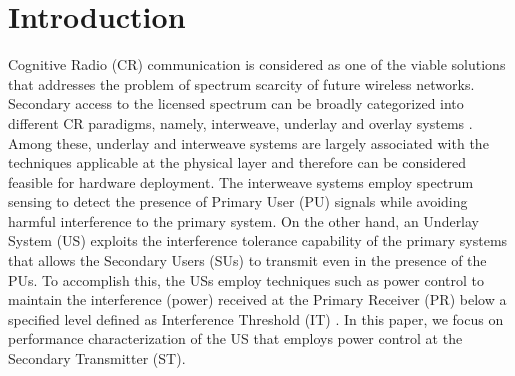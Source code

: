 \section{Introduction}%
Cognitive Radio (CR) communication is considered as one of the viable solutions that addresses the problem of spectrum scarcity of future wireless networks. Secondary access to the licensed spectrum can be broadly categorized into different CR paradigms, namely, interweave, underlay and overlay systems \cite{Goldsmith09}. Among these, underlay and interweave systems are largely associated with the techniques applicable at the physical layer and therefore can be considered feasible for hardware deployment. %
The interweave systems employ spectrum sensing to detect the presence of Primary User (PU) signals while avoiding harmful interference to the primary system. On the other hand, an Underlay System (US) exploits the interference tolerance capability of the primary systems that allows the Secondary Users (SUs) to transmit even in the presence of the PUs. To accomplish this, the USs employ techniques such as power control to maintain the interference (power) received at the Primary Receiver (PR) below a specified level defined as Interference Threshold (IT) \cite{Xing07}. In this paper, we focus on performance characterization of the US that employs power control at the Secondary Transmitter (ST).  

